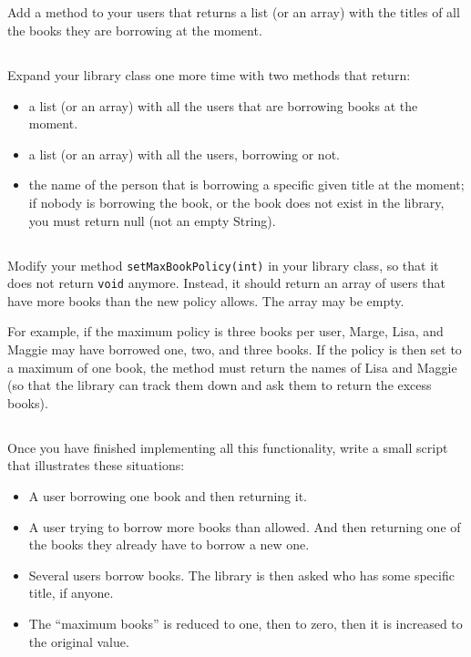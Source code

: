 \documentclass{article}
\begin{document}
\subsection{}

Add a method to your users that returns a list (or an array) with the
titles of all the books they are borrowing at the moment. 

\subsection{}

Expand your library class one more time with two methods that return: 

\begin{itemize}
\item a list (or an array) with all the users that are borrowing books
  at the moment.
\item a list (or an array) with all the users, borrowing or not.
\item the name of the person that is borrowing a specific given title
  at the moment; if nobody is borrowing the book, or the book does not
  exist in the library, you must return null (not an empty String). 
\end{itemize}

\subsection{}

Modify your method \verb+setMaxBookPolicy(int)+ in your library class,
so that it does not return \verb+void+ anymore. Instead, it should
return an array of users that have more books than the new policy
allows. The array may be empty. 

For example, if the maximum policy is three books per user, Marge,
Lisa, and Maggie may have borrowed one, two, and three books. If the
policy is then set to a maximum of one book, the method must return
the names of Lisa and Maggie (so that the library can track them down
and ask them to return the excess books).

\subsection{}

Once you have finished implementing all this functionality, write a
small script that illustrates these situations: 

\begin{itemize}
\item A user borrowing one book and then returning it.
\item A user trying to borrow more books than allowed. And then
  returning one of the books they already have to borrow a new one.
\item Several users borrow books. The library is then asked who has
  some specific title, if anyone. 
\item The ``maximum books'' is reduced to one, then to zero, then it
  is increased to the original value.  
\end{itemize}
\end{document}
